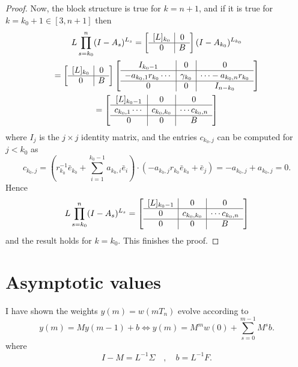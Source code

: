 \documentclass[]{interact}
\theoremstyle{plain}%
\theoremstyle{definition}
\theoremstyle{remark}
\begin{document}
\begin{proof}
Now, the block structure is true for $k=n+1$, and if it is true for $k=k_0+1\in [3, n+1]$ then
\begin{multline*}
L\prod_{s=k_{0}}^n(I-A_s)^{L_s}=\left[\begin{array}{c | c}
[L]_{k_0} &0 \\ \hline
0& B
\end{array}\right](I-A_{k_0})^{L_{k_0}}\\=\left[\begin{array}{c | c}
[L]_{k_0} &0 \\ \hline
0& B
\end{array}\right]
\left[\begin{array}{c | c | c}
I_{k_0-1} &0 & 0\\ \hline
-a_{k_0,1}r_{k_0}\cdots & \gamma_{k_0} & \cdots -a_{k_0,n}r_{k_0}\\ \hline
0 & 0 & I_{n-k_0}
\end{array}\right]\\
=\left[\begin{array}{c | c | c}
[L]_{k_0-1} &0 & 0\\ \hline
c_{k_0,1}\cdots & c_{k_0,k_0} & \cdots c_{k_0,n}\\ \hline
0 & 0 & B
\end{array}\right]
\end{multline*}
where $I_j$ is the $j\times j$ identity matrix, and the entries $c_{k_0,j}$ can be computed for $j< k_0$ as
\[
c_{k_0,j}=\left( r_{k_0}^{-1}\bar{e}_{k_0}+\sum_{i=1}^{k_0-1}a_{k_0,i}\bar{e}_i\right) \cdot \left( -a_{k_0,j}r_{k_0}\bar{e}_{k_0}+\bar{e}_j\right) =-a_{k_0,j}+a_{k_0,j}=0.
\]
Hence
\[
L\prod_{s=k_{0}}^n(I-A_s)^{L_s} =\left[\begin{array}{c | c | c}
[L]_{k_0-1} &0 & 0\\ \hline
0 & c_{k_0,k_0} & \cdots c_{k_0,n}\\ \hline
0 & 0 & B
\end{array}\right]
\]
and the result holds for $k=k_0$. This finishes the proof. 
\end{proof}

\section{Asymptotic values}\label{eigenvalues}

I have shown the weights $y(m)=w(mT_n)$ evolve according to
\[
y(m)=My(m-1)+b \Leftrightarrow y(m)=M^{m}w(0)+\sum_{s=0}^{m-1}M^{s}b.
\]
where
\[
I-M=L^{-1}\Sigma \quad , \quad b=L^{-1}F.
\]
\end{document}

